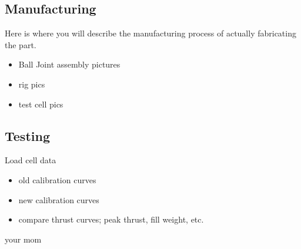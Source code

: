 \documentclass[10pt,a4paper]{article}
\begin{document}
\newpage
\subsection{Manufacturing}

Here is where you will describe the manufacturing process of actually fabricating the part.
\begin{itemize}
	\item Ball Joint assembly pictures
	\item rig pics
	\item test cell pics 
\end{itemize}

\subsection{Testing}

Load cell data
\begin{itemize}
	\item old calibration curves
	\item new calibration curves
	\item compare thrust curves; peak thrust, fill weight, etc.
\end{itemize}


\begin{thebibliography}{10}
	
	your mom
	
\end{thebibliography}
\end{document}
